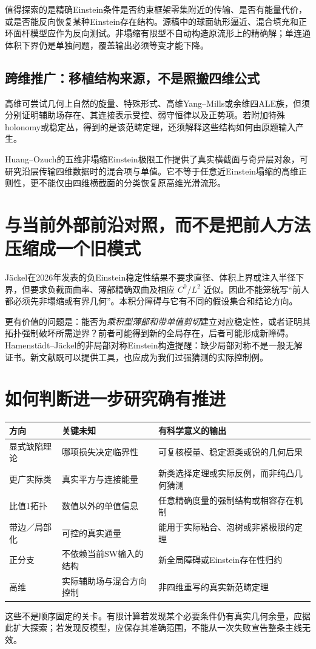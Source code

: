 \documentclass[UTF8,fontset=fandol,zihao=-4]{ctexart}
\theoremstyle{research}
\begin{document}
值得探索的是精确Einstein条件是否约束框架零集附近的传输、是否有能量代价，或是否能反向恢复某种Einstein存在结构。源稿中的球面轨形逼近、混合填充和正环面杆模型应作为反向测试。非塌缩有限型\cite{CN}不自动构造原流形上的精确解；单连通体积下界仍是单独问题，覆盖输出必须等变才能下降。

\subsection{跨维推广：移植结构来源，不是照搬四维公式}
高维可尝试几何上自然的旋量、特殊形式、高维Yang--Mills或余维四ALE族，但须分别证明辅助场存在、其连接表示受控、弱守恒律以及正势项。若附加特殊holonomy或稳定丛，得到的是该范畴定理，还须解释这些结构如何由原题输入产生。

Huang--Ozuch的五维非塌缩Einstein极限工作\cite{HO}提供了真实横截面与奇异层对象，可研究沿层传输四维数据时的混合项与单值。它不等于任意近Einstein塌缩的高维正则性，更不能仅由四维横截面的分类恢复原高维光滑流形。

\section[与当前外部前沿的准确对照]{与当前外部前沿对照，而不是把前人方法压缩成一个旧模式}
Jäckel在2026年发表的负Einstein稳定性结果不要求直径、体积上界或注入半径下界，但要求负截面曲率、薄部精确双曲及相应 $C^0/L^2$ 近似\cite{Jackel}。因此不能笼统写“前人都必须先非塌缩或有界几何”。本积分障碍与它有不同的假设集合和结论方向。

更有价值的问题是：能否为\emph{乘积型薄部和带单值剪切}建立对应稳定性，或者证明其拓扑强制破坏所需逆界？前者可能得到新的全局存在，后者可能形成新障碍。Hamenstädt--Jäckel的非局部对称Einstein构造\cite{HJ}提醒：缺少局部对称不是一般无解证书。新文献既可以提供工具，也应成为我们过强猜测的实际控制例。

\section{如何判断进一步研究确有推进}
\begin{longtable}{P{.21\textwidth}P{.35\textwidth}P{.35\textwidth}}
\toprule 方向 & 关键未知 & 有科学意义的输出\\\midrule\endhead
显式缺陷理论 & 哪项损失决定临界性 & 可复核模量、稳定源类或锐的几何后果\\
更广实际类 & 真实平方与连接能量 & 新类选择定理或实际反例，而非纯凸几何猜测\\
比值1拓扑 & 数值以外的单值信息 & 任意精确度量的强制结构或相容存在机制\\
带边／局部化 & 可控的真实通量 & 能用于实际粘合、泡树或非紧极限的定理\\
正分支 & 不依赖当前SW输入的结构 & 新全局障碍或Einstein存在性归约\\
高维 & 实际辅助场与混合方向控制 & 非四维重写的真实新范畴定理\\\bottomrule
\end{longtable}
这些不是顺序固定的关卡。有限计算若发现某个必要条件仍有真实几何余量，应据此扩大探索；若发现反模型，应保存其准确范围，不能从一次失败宣告整条主线无效。
\end{document}
